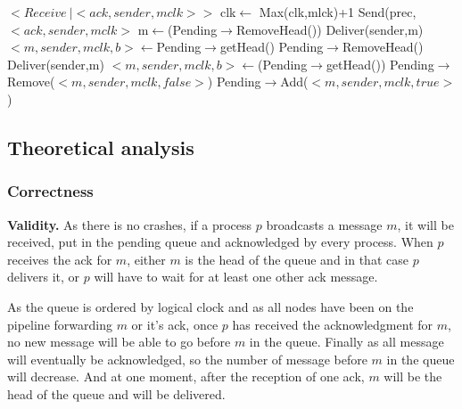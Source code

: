 \documentclass[a4paper]{article}
\begin{document}
\begin{algorithm}[H]
    \centering
    \begin{algorithmic}[5]

        \Event $<Receive\  | <ack,sender, mclk>>$
        \State clk$\gets$ Max(clk,mlck)+1
        \State Send(prec,$<ack,sender,mclk>$
        \EndIf
        \State m$\gets$(Pending$\rightarrow$RemoveHead())
        \State Deliver(sender,m)
        \State $<m,sender,mclk,b>\gets$Pending$\rightarrow$getHead()
        \State Pending$\rightarrow$RemoveHead()
        \State Deliver(sender,m)
        \State $<m,sender,mclk,b>\gets$(Pending$\rightarrow$getHead())
        \EndWhile
        \Else
        \State Pending$\rightarrow$Remove($<m,sender,mclk,false>$)
        \State Pending$\rightarrow$Add($<m,sender,mclk,true>$)
        \EndIf
        \EndEvent
    \end{algorithmic}
\end{algorithm}


\subsection{Theoretical analysis}
\subsubsection{Correctness}
\label{sec:pipelineack-proof}
\noindent\textbf{Validity.} As there is no crashes, if a process $p$
broadcasts a message $m$, it will be received, put in the pending queue and
acknowledged by every process. When $p$ receives the ack for $m$, either $m$
is the head of the queue and in that case $p$ delivers it, or $p$ will have
to wait for at least one other ack message.

As the queue is ordered by logical clock and as all nodes have been on the
pipeline forwarding $m$ or it's ack, once $p$ has received the acknowledgment
for $m$, no new message will be able to go before $m$ in the queue. Finally as
all message will eventually be acknowledged, so the number of message before
$m$ in the queue will decrease. And at one moment, after the reception of one
ack, $m$ will be the head of the queue and will be delivered.
\end{document}
